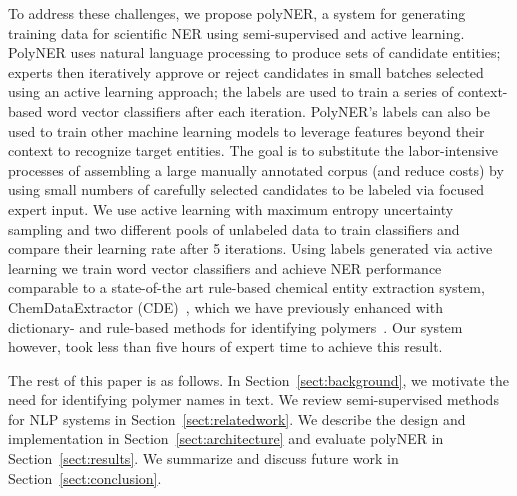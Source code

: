 To address these challenges, we propose polyNER, a system for generating training data for scientific NER using semi-supervised and active learning. 
PolyNER uses natural language processing to produce sets of candidate entities;
experts then iteratively approve or reject candidates in small batches selected using an active learning approach;
the labels are used to train a series of context-based word vector classifiers after each iteration.
PolyNER's labels can also be used to train other machine learning models to leverage features beyond their context to recognize target entities.
The goal is
to substitute the labor-intensive processes of assembling a large
manually annotated corpus (and reduce costs) by using small numbers of carefully selected candidates to be labeled via focused expert input. 
We use active learning with maximum entropy uncertainty sampling and two different pools of unlabeled data to train classifiers and compare their learning rate after 5 iterations. 
Using labels generated via active learning we train word vector classifiers and achieve NER performance comparable to 
a state-of-the art rule-based chemical entity extraction
system, ChemDataExtractor (CDE)~\cite{swain2016chemdataextractor}, which we have previously enhanced
with dictionary- and rule-based methods for identifying polymers~\cite{tchoua2017towards}.
Our system however, took less than five hours of expert time to achieve this result.


The rest of this paper is as follows. 
In Section~\ref{sect:background}, we motivate the need for identifying polymer names in
text. 
We review semi-supervised methods for NLP systems in
Section~\ref{sect:relatedwork}. 
We describe the design and implementation in Section~\ref{sect:architecture} and evaluate polyNER
in Section~\ref{sect:results}. We summarize and discuss future work in Section~\ref{sect:conclusion}.